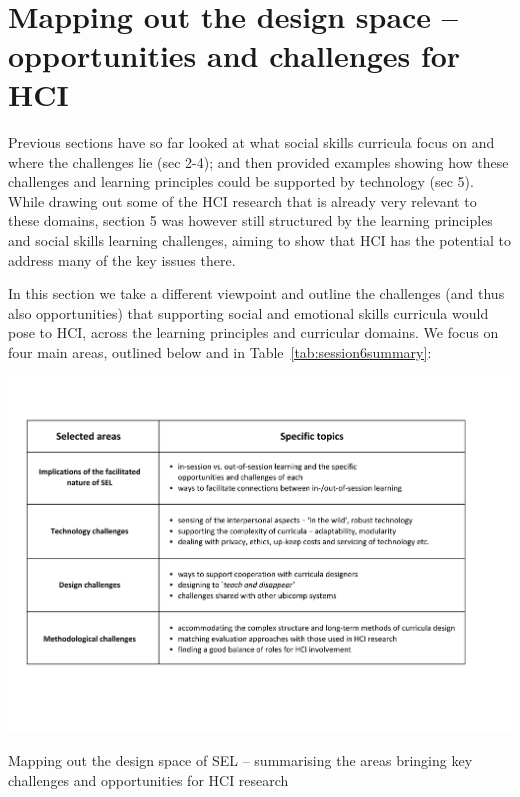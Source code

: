 \documentclass[prodmode,acmtochi]{acmsmall}
\begin{document}
\vfill ~ \pagebreak

\section{Mapping out the design space -- opportunities and challenges for HCI}
\label{sec:agenda}
  

Previous sections have so far looked at what social skills curricula focus on and where the challenges lie (sec 2-4);  and then provided examples showing how these challenges and learning principles could be supported by technology (sec 5).  While drawing out some of the HCI research that is already very relevant to these domains, section 5 was however still structured by the learning principles and social skills learning challenges, aiming to show that HCI has the potential to address many of the key issues there. 

In this section we take a different viewpoint and outline the challenges (and thus also opportunities) that supporting social and emotional skills curricula would pose to HCI, across the learning principles and curricular domains. We focus on four main areas, outlined below and in Table~\ref{tab:session6summary}:


\begin{table}
  \centering
        \includegraphics[width=\textwidth]{images/Section6Summary.pdf}
        \caption{Mapping out the design space of SEL -- summarising the areas bringing key challenges and opportunities for HCI research}
        \label{tab:session6summary}
\end{table}
\end{document}
